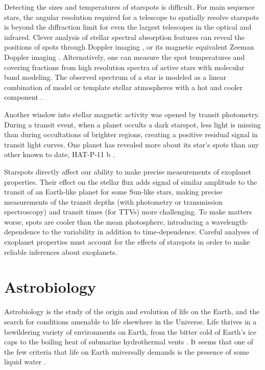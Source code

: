 Detecting the sizes and temperatures of starspots is difficult. For main sequence stars, the angular resolution required for a telescope to spatially resolve starspots is beyond the diffraction limit for even the largest telescopes in the optical and infrared. Clever analysis of stellar spectral absorption features can reveal the positions of spots through Doppler imaging \citep{Vogt1983,Barnes2001,Strassmeier2002}, or its magnetic equivalent Zeeman Doppler imaging \citep{Donati2003,Morin2008,Morin2010,Morin2011,Morin2013}. Alternatively, one can measure the spot temperatures and covering fractions from high resolution spectra of active stars with molecular band modeling. The observed spectrum of a star is modeled as a linear combination of model or template stellar atmospheres with a hot and cooler component \citep{Neff1995,oneal1996,oneal1998,ONeal2004}. 

Another window into stellar magnetic activity was opened by \kepler transit photometry. During a transit event, when a planet occults a dark starspot, less light is missing than during occultations of brighter regions, creating a positive residual signal in transit light curves. One planet has revealed more about its star's spots than any other known to date, HAT-P-11 b \citep{Bakos2010,Winn2010,Deming2011,Sanchis-Ojeda2011,Hirano2011}. 

Starspots directly affect our ability to make precise measurements of exoplanet properties. Their effect on the stellar flux adds signal of similar amplitude to the transit of an Earth-like planet for some Sun-like stars, making precise measurements of the transit depths (with photometry or transmission spectroscopy) and transit times (for TTVs) more challenging. To make matters worse, spots are cooler than the mean photosphere, introducing a wavelength-dependence to the variability in addition to time-dependence. Careful analyses of exoplanet properties must account for the effects of starspots in order to make reliable inferences about exoplanets. 

\section{Astrobiology} \label{sec:ab}

Astrobiology is the study of the origin and evolution of life on the Earth, and the search for conditions amenable to life elsewhere in the Universe. Life thrives in a bewildering variety of environments on Earth, from the bitter cold of Earth's ice caps to the boiling heat of submarine hydrothermal vents \citep{Rothschild2001,Cavicchioli2002}. It seems that one of the few criteria that life on Earth universally demands is the presence of some liquid water \citep{DesMarais2002}. 


